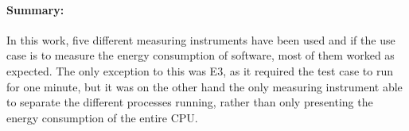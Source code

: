 \paragraph*{Summary:} In this work, five different measuring instruments have been used and if the use case is to measure the energy consumption of software, most of them worked as expected. The only exception to this was E3, as it required the test case to run for one minute, but it was on the other hand the only measuring instrument able to separate the different processes running, rather than only presenting the energy consumption of the entire CPU. 